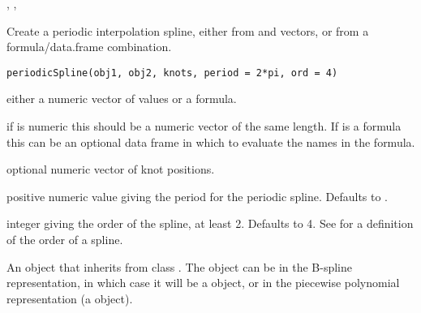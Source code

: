 %
\begin{SeeAlso}\relax
{}, , 
\end{SeeAlso}
%
\begin{Examples}
\end{Examples}
%
\begin{Description}\relax
Create a periodic interpolation spline, either from  and
 vectors, or from a formula/data.frame combination.
\end{Description}
%
\begin{Usage}
\begin{verbatim}
periodicSpline(obj1, obj2, knots, period = 2*pi, ord = 4)
\end{verbatim}
\end{Usage}
%
\begin{Arguments}
\begin{ldescription}
\item[\code{obj1}] either a numeric vector of  values or a formula.
\item[\code{obj2}] if  is numeric this should be a numeric vector
of the same length.  If  is a formula this can be an
optional data frame in which to evaluate the names in the formula.
\item[\code{knots}] optional numeric vector of knot positions.
\item[\code{period}] positive numeric value giving the period for the
periodic spline.  Defaults to .
\item[\code{ord}] integer giving the order of the spline, at least 2.  Defaults
to 4.  See  for a definition of the order of
a spline.
\end{ldescription}
\end{Arguments}
%
\begin{Value}
An object that inherits from class .  The object can be in
the B-spline representation, in which case it will be a
 object, or in the piecewise polynomial representation
(a  object).
\end{Value}
